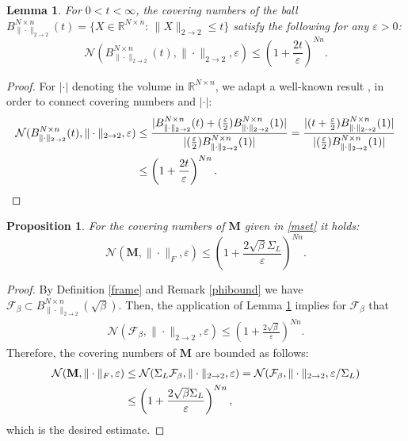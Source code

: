 \documentclass[preprint,12pt]{elsarticle}
\newtheorem{lemma}[theorem]{Lemma}
\newtheorem{proposition}[theorem]{Proposition}
\newcommand{\opnorm}{2\rightarrow2}
\begin{document}
\begin{lemma}\label{cover}
For $0<t<\infty$, the covering numbers of the ball $B_{\|\cdot\|_{\opnorm}}^{N\times n}(t)=\{X\in\mathbb{R}^{N\times n}:\,\|X\|_{\opnorm}\leq t\}$ satisfy the following for any $\varepsilon>0$:
\begin{equation}
    \mathcal{N}(B_{\|\cdot\|_{\opnorm}}^{N\times n}(t),\|\cdot\|_{\opnorm},\varepsilon)\leq\left(1+\frac{2t}{\varepsilon}\right)^{Nn}.
\end{equation}
\end{lemma}

\begin{proof}
For $|\cdot|$ denoting the volume in $\mathbb{R}^{N\times n}$, we adapt a well-known result \cite[Proposition 4.2.12]{vershynin}, in order to connect covering numbers and $|\cdot|$:
\begin{align*}
    \mathcal{N}(B_{\|\cdot\|_{\opnorm}}^{N\times n}(t),\|\cdot\|_{\opnorm},\varepsilon)&\leq\frac{|B_{\|\cdot\|_{\opnorm}}^{N\times n}(t)+(\frac{\varepsilon}{2})B_{\|\cdot\|_{\opnorm}}^{N\times n}(1)|}{|(\frac{\varepsilon}{2})B_{\|\cdot\|_{\opnorm}}^{N\times n}(1)|}=\frac{|(t+\frac{\varepsilon}{2})B_{\|\cdot\|_{\opnorm}}^{N\times n}(1)|}{|(\frac{\varepsilon}{2})B_{\|\cdot\|_{\opnorm}}^{N\times n}(1)|}\\
    &\leq\left(1+\frac{2t}{\varepsilon}\right)^{Nn}.\qedhere
\end{align*}
\end{proof}

\begin{proposition}\label{mcover}
For the covering numbers of $\mathbf{M}$ given in \eqref{mset} it holds:
\begin{equation}
    \mathcal{N}(\mathbf{M},\|\cdot\|_F,\varepsilon)\leq\left(1+\frac{2\sqrt{\beta }\Sigma_L}{\varepsilon}\right)^{Nn}.
\end{equation}
\end{proposition}

\begin{proof}
    By Definition \ref{frame} and Remark \ref{phibound} we have $\mathcal{F}_{\beta}\subset B_{\|\cdot\|_{\opnorm}}^{N\times n}(\sqrt{\beta})$. Then, the application of Lemma \ref{cover} implies for $\mathcal{F}_{\beta }$ that
    \begin{align}
        \mathcal{N}(\mathcal{F}_{\beta },\|\cdot\|_{\opnorm},\varepsilon)\leq\left(1+\frac{2\sqrt{\beta }}{\varepsilon}\right)^{Nn}.
    \end{align}
Therefore, the covering numbers of $\mathbf{M}$ are bounded as follows:
\begin{align}
    \mathcal{N}(\mathbf{M},\|\cdot\|_F,\varepsilon)&\leq\mathcal{N}(\Sigma_L\mathcal{F}_{\beta },\|\cdot\|_{\opnorm},\varepsilon)=\mathcal{N}(\mathcal{F}_{\beta },\|\cdot\|_{\opnorm},\varepsilon/\Sigma_L)\notag\\
    &\leq\left(1+\frac{2\sqrt{\beta }\Sigma_L}{\varepsilon}\right)^{Nn},
\end{align}
which is the desired estimate.
\end{proof}
\end{document}
